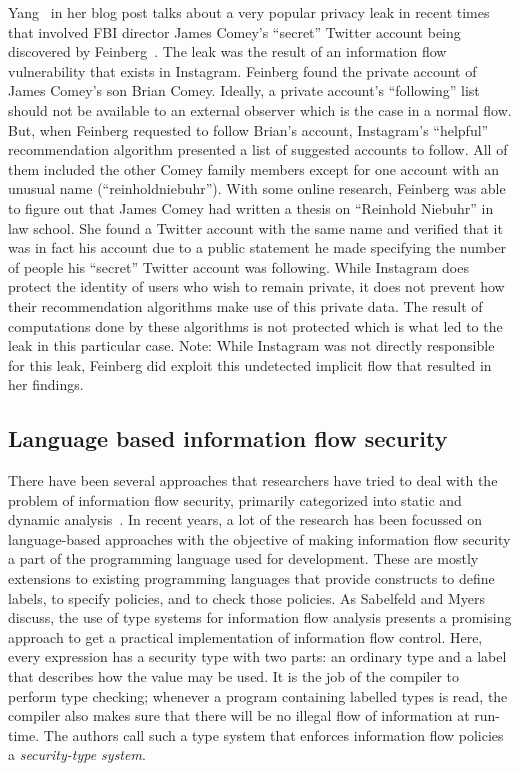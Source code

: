 Yang~\cite{comey} in her blog post talks about a very popular privacy leak in recent
times that involved FBI director James Comey's ``secret'' Twitter account being
discovered by Feinberg~\cite{gizmodo}. The leak was the result of an information
flow vulnerability that exists in Instagram. Feinberg found the private account
of James Comey's son Brian Comey. Ideally, a private account's ``following'' list
should not be available to an external observer which is the case in a normal flow.
But, when Feinberg requested to follow Brian's account, Instagram's ``helpful''
recommendation algorithm presented a list of suggested accounts to follow. All
of them included the other Comey family members except for one account with an
unusual name (``reinholdniebuhr''). With some online research, Feinberg was able
to figure out that James Comey had written a thesis on ``Reinhold Niebuhr'' in law
school. She found a Twitter account with the same name and verified that it was
in fact his account due to a public statement he made specifying the number of
people his ``secret'' Twitter account was following. While Instagram does protect
the identity of users who wish to remain private, it does not prevent how their
recommendation algorithms make use of this private data. The result of computations
done by these algorithms is not protected which is what led to the leak in this
particular case. Note: While Instagram was not directly responsible for this leak,
Feinberg did exploit this undetected implicit flow that resulted in her findings.

\subsection{Language based information flow security \label{subsec:langinfo}}
There have been several approaches that researchers have tried to deal with the
problem of information flow security, primarily categorized into static and dynamic
analysis~\cite{Russo, Chlipala}. In recent years, a lot of the research has been
focussed on language-based approaches with the objective of making information
flow security a part of the programming language used for development. These are
mostly extensions to existing programming languages that provide constructs to define
labels, to specify policies, and to check those policies. As Sabelfeld and Myers~\cite{LangInfo}
discuss, the use of type systems for information flow analysis presents a promising
approach to get a practical implementation of information flow control. Here, every
expression has a security type with two parts: an ordinary type and a label that
describes how the value may be used. It is the job of the compiler to perform type
checking; whenever a program containing labelled types is read, the compiler also
makes sure that there will be no illegal flow of information at run-time. The authors
call such a type system that enforces information flow policies a \textit{security-type
system}.

